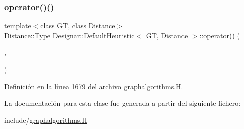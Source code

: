 \subsubsection{\texorpdfstring{operator()()}{operator()()}}
{\footnotesize\ttfamily template$<$class GT, class Distance$>$ \\
Distance\+::\+Type \hyperlink{class_designar_1_1_default_heuristic}{Designar\+::\+Default\+Heuristic}$<$ \hyperlink{demo-buildgraph_8_c_a3001c40d2c31ca87ed96cd7d1334a55e}{GT}, Distance $>$\+::operator() (\begin{DoxyParamCaption}\item[{typename \hyperlink{test-mtreenode_8_c_a17a24b0725f59987143c5faf63c4dc6f}{G\+T\+::\+Node} \&}]{,  }\item[{typename \hyperlink{test-mtreenode_8_c_a17a24b0725f59987143c5faf63c4dc6f}{G\+T\+::\+Node} \&}]{ }\end{DoxyParamCaption})\hspace{0.3cm}{\ttfamily [inline]}}



Definición en la línea 1679 del archivo graphalgorithms.\+H.



La documentación para esta clase fue generada a partir del siguiente fichero\+:\begin{DoxyCompactItemize}
\item 
include/\hyperlink{graphalgorithms_8_h}{graphalgorithms.\+H}\end{DoxyCompactItemize}
